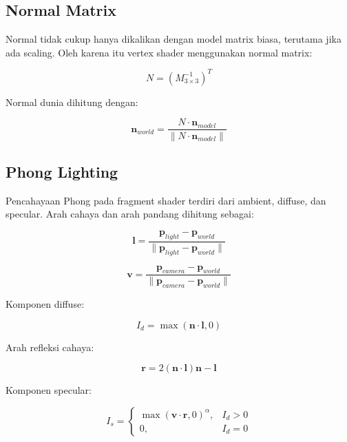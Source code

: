 \documentclass[12pt,a4paper]{article}
\begin{document}
\subsection{Normal Matrix}

Normal tidak cukup hanya dikalikan dengan model matrix biasa, terutama jika
ada scaling. Oleh karena itu vertex shader menggunakan normal matrix:

\begin{equation}
    N = \left(M_{3 \times 3}^{-1}\right)^T
\end{equation}

Normal dunia dihitung dengan:

\begin{equation}
    \mathbf{n}_{world} =
    \frac{N \cdot \mathbf{n}_{model}}
    {\|N \cdot \mathbf{n}_{model}\|}
\end{equation}

\subsection{Phong Lighting}

Pencahayaan Phong pada fragment shader terdiri dari ambient, diffuse, dan
specular. Arah cahaya dan arah pandang dihitung sebagai:

\begin{equation}
    \mathbf{l} =
    \frac{\mathbf{p}_{light} - \mathbf{p}_{world}}
    {\|\mathbf{p}_{light} - \mathbf{p}_{world}\|}
\end{equation}

\begin{equation}
    \mathbf{v} =
    \frac{\mathbf{p}_{camera} - \mathbf{p}_{world}}
    {\|\mathbf{p}_{camera} - \mathbf{p}_{world}\|}
\end{equation}

Komponen diffuse:

\begin{equation}
    I_d = \max(\mathbf{n} \cdot \mathbf{l}, 0)
\end{equation}

Arah refleksi cahaya:

\begin{equation}
    \mathbf{r} =
    2(\mathbf{n}\cdot\mathbf{l})\mathbf{n} - \mathbf{l}
\end{equation}

Komponen specular:

\begin{equation}
    I_s =
    \begin{cases}
        \max(\mathbf{v}\cdot\mathbf{r}, 0)^\alpha, & I_d > 0 \\
        0, & I_d = 0
    \end{cases}
\end{equation}
\end{document}
